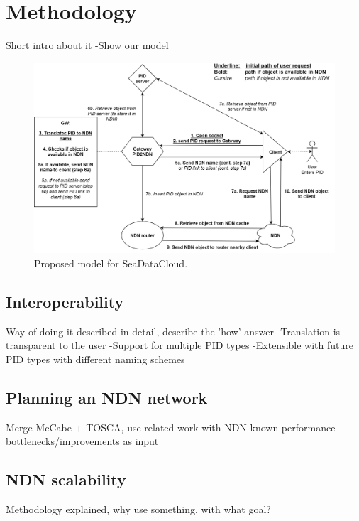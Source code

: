 \section{Methodology}\label{method}
Short intro about it
-Show our model

\begin{figure}[H]
\centering
\includegraphics[scale=0.25]{Images/PIDNDN_edit_final_5.png}
\caption{Proposed model for SeaDataCloud.}
\label{fig:sdc_model}
\end{figure}

\subsection{Interoperability}
Way of doing it described in detail, describe the 'how' answer
-Translation is transparent to the user
-Support for multiple PID types
-Extensible with future PID types with different naming schemes

\subsection{Planning an NDN network}
\label{method-planning}
Merge McCabe + TOSCA, use related work with NDN known performance bottlenecks/improvements as input

\subsection{NDN scalability}
Methodology explained, why use something, with what goal?